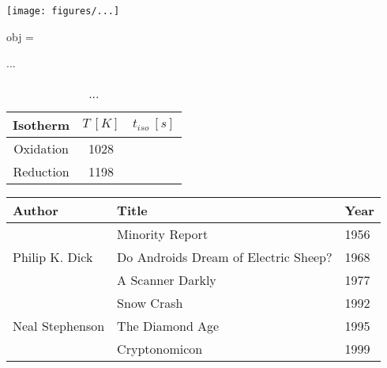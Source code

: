 \texttt{[image: figures/...]} %


\usepackage{eso-pic}

 \scalebox{0.6}{obj}
 obj = \begin{tabular}...\end{tabular}


\usepackage{booktabs}  %

\usepackage{longtable}


\begin{table}[htb]
\centering            %
\begin{tabular}{|c|c|c|}
  \hline
  Isotherm & $T\ [K]$ & $t_{iso}\ [s]$ \\
  \hline
  Oxidation & 1028 &  \\
  Reduction & 1198 &  \\
  \hline
\end{tabular}
\caption{...}
\label{...}
\end{table}


\usepackage{float}

\usepackage{multirow}

\begin{tabular}{|l|l|l|}
\hline
Author & Title & Year \\
\hline
\hline
\multirow{3}{*}{Philip K. Dick} & Minority Report & 1956 \\
\hline
 & Do Androids Dream of Electric Sheep? & 1968 \\
\hline
 & A Scanner Darkly & 1977 \\
\hline
\multirow{3}{*}{Neal Stephenson} & Snow Crash & 1992 \\
\hline
 & The Diamond Age & 1995 \\
\hline
 & Cryptonomicon & 1999 \\
\hline
\end{tabular}


